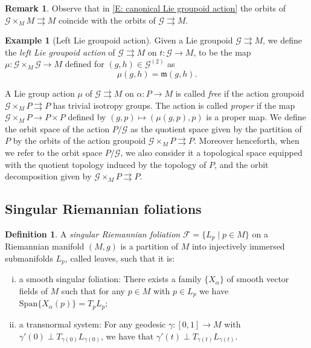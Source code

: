 \documentclass[12pt,a4paper,reqno]{amsart}
\newcommand{\1}{\mathbbm{1}} %
\newcommand{\fol}{\mathcal{F}} %
\newcommand{\G}{\mathcal{G}} %
\newcommand{\m}{\mathfrak{m}} %
\theoremstyle{definition}
\newtheorem{remark}[thm]{Remark}
\newtheorem{definition}[thm]{Definition}
\newtheorem{example}[thm]{Example}
\theoremstyle{TheoremNum}
\begin{document}
\begin{remark}
Observe that in \th\ref{E: canonical Lie groupoid action} the orbits of $\G\times_M M\rightrightarrows M$ coincide with the orbits of $\G\rightrightarrows M$.
\end{remark}

\begin{example}[Left Lie groupoid action]\th\label{E: Left Lie groupoid action}
Given a Lie groupoid $\G\rightrightarrows M$, we define the \emph{left Lie groupoid action} of $\G\rightrightarrows M$ on $t\colon \G\to M$, to be the map $\mu\colon \G\times_M \G\to M$ defined for $(g,h)\in \G^{(2)}$ as
\[
\mu(g,h) = \m(g,h).
\]
\end{example}

A Lie group action $\mu$ of $\G\rightrightarrows M$ on $\alpha\colon P\to M$ is called \emph{free} if the action groupoid $\G\times_M P\rightrightarrows P$ has trivial isotropy groups. The action is called \emph{proper} if the map $\G\times_M P\to P\times P$ defined by $(g,p)\mapsto (\mu(g,p),p)$ is a proper map. We define the orbit space of the action $P/\G$ as the quotient space given by the partition of $P$ by the orbits of the action groupoid $\G\times_M P\rightrightarrows P$. Moreover henceforth, when we refer to the orbit space $P/\G$, we also consider it a topological space equipped  with the quotient topology induced by the topology of $P$, and the orbit decomposition given by $\G\times_M P\rightrightarrows P$.

\subsection{Singular Riemannian foliations}

\begin{definition}\th\label{D: Singular Riemannian foliation}
A \emph{singular Riemannian foliation} $\fol=\{L_p\mid p\in M\}$ on a Riemannian manifold $(M,g)$ is a partition of $M$ into injectively immersed submanifolds $L_p$, called leaves, such that it is:
\begin{enumerate}[(i)]
\item a smooth singular foliation: There exists a family $\{X_\alpha\}$ of smooth vector fields of $M$ such that for any $p\in M$ with $p\in L_p$ we have $\mathrm{Span}\{X_\alpha(p)\} = T_p L_p$;
\item a transnormal system: For any geodesic $\gamma\colon [0,1]\to M$ with $\gamma'(0)\perp T_{\gamma(0)} L_{\gamma(0)}$, we have that $\gamma'(t)\perp T_{\gamma(t)} L_{\gamma(t)}$.
\end{enumerate}
\end{definition}
\end{document}
